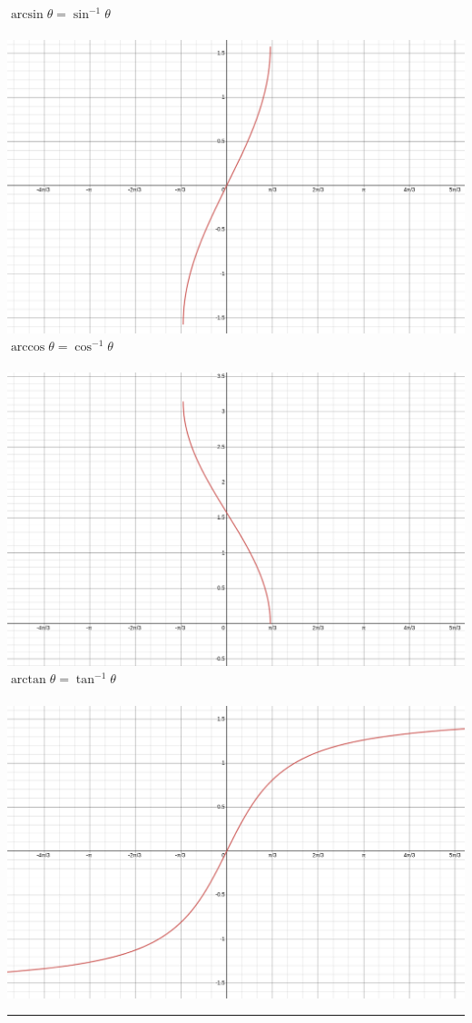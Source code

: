 \documentclass{article}
\begin{document}
\begin{multicols}{3}
    \noindent
    $\arcsin \theta = \sin^{-1} \theta$             \\\\
    \includegraphics[scale=0.15]{images/arcsin.png} \\
    $\arccos \theta = \cos^{-1} \theta$             \\\\
    \includegraphics[scale=0.15]{images/arccos.png} \\
    $\arctan \theta = \tan^{-1} \theta$             \\\\
    \includegraphics[scale=0.15]{images/arctan.png} 
\end{multicols}
\hrule
\end{document}
